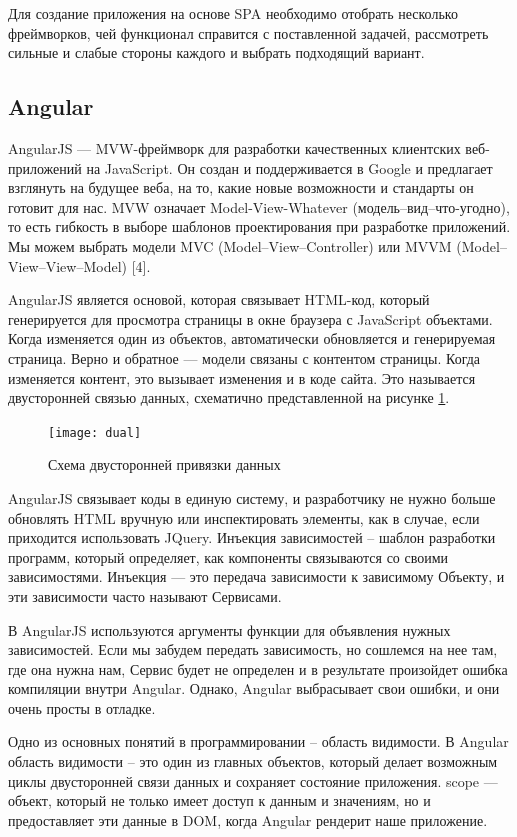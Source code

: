 Для создание приложения на основе SPA необходимо отобрать несколько фреймворков, чей функционал справится с поставленной задачей, рассмотреть сильные и слабые стороны каждого и выбрать подходящий вариант.

\subsection {Angular}

AngularJS --- MVW-фреймворк для разработки качественных клиентских веб-приложений на JavaScript. Он создан и поддерживается в Google и предлагает взглянуть на будущее веба, на то, какие новые возможности и стандарты он готовит для нас. MVW означает Model-View-Whatever (модель--вид--что-угодно), то есть гибкость в выборе шаблонов проектирования при разработке приложений. Мы можем выбрать модели MVC (Model--View--Controller) или MVVM (Model--View--View--Model) [4].

AngularJS является основой, которая связывает HTML-код, который генерируется для просмотра страницы в окне браузера с JavaScript объектами. Когда изменяется один из объектов, автоматически обновляется и генерируемая страница. Верно и обратное --- модели связаны с контентом страницы. Когда изменяется контент, это вызывает изменения и в коде сайта. Это называется двусторонней связью данных, схематично представленной на рисунке \ref{dual}.

\begin{figure}[ht]
\center\texttt{[image: dual]}
\caption{Схема двусторонней привязки данных}\label{dual}
\end{figure}

AngularJS связывает коды в единую систему, и разработчику не нужно больше обновлять HTML вручную или инспектировать элементы, как в случае, если приходится использовать JQuery.
Инъекция зависимостей – шаблон разработки программ, который определяет, как компоненты связываются со своими зависимостями. Инъекция — это передача зависимости к зависимому Объекту, и эти зависимости часто называют Сервисами.

В AngularJS используются аргументы функции для объявления нужных зависимостей. Если мы забудем передать зависимость, но сошлемся на нее там, где она нужна нам, Сервис будет не определен и в результате произойдет ошибка компиляции внутри Angular. Однако, Angular выбрасывает свои ошибки, и они очень просты в отладке.

Одно из основных понятий в программировании – область видимости. В Angular область видимости – это один из главных объектов, который делает возможным циклы двусторонней связи данных и сохраняет состояние приложения. \textdollar scope --- объект, который не только имеет доступ к данным и значениям, но и предоставляет эти данные в DOM, когда Angular рендерит наше приложение.

